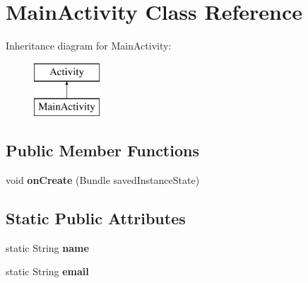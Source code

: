 \hypertarget{classcom_1_1example_1_1android_1_1apis_1_1_main_activity}{\section{Main\-Activity Class Reference}
\label{classcom_1_1example_1_1android_1_1apis_1_1_main_activity}
}
Inheritance diagram for Main\-Activity\-:\begin{figure}[H]
\begin{center}
\leavevmode
\includegraphics[height=2.000000cm]{classcom_1_1example_1_1android_1_1apis_1_1_main_activity}
\end{center}
\end{figure}
\subsection*{Public Member Functions}
\begin{DoxyCompactItemize}
\item 
\hypertarget{classcom_1_1example_1_1android_1_1apis_1_1_main_activity_a85e87cb5ced88dff7c8173ecc4f636d1}{void {\bfseries on\-Create} (Bundle saved\-Instance\-State)}\label{classcom_1_1example_1_1android_1_1apis_1_1_main_activity_a85e87cb5ced88dff7c8173ecc4f636d1}

\end{DoxyCompactItemize}
\subsection*{Static Public Attributes}
\begin{DoxyCompactItemize}
\item 
\hypertarget{classcom_1_1example_1_1android_1_1apis_1_1_main_activity_a9a2326f35466e54c36c070829245c557}{static String {\bfseries name}}\label{classcom_1_1example_1_1android_1_1apis_1_1_main_activity_a9a2326f35466e54c36c070829245c557}

\item 
\hypertarget{classcom_1_1example_1_1android_1_1apis_1_1_main_activity_ac120cf8981125377a85fe62e1557a509}{static String {\bfseries email}}\label{classcom_1_1example_1_1android_1_1apis_1_1_main_activity_ac120cf8981125377a85fe62e1557a509}

\end{DoxyCompactItemize}
